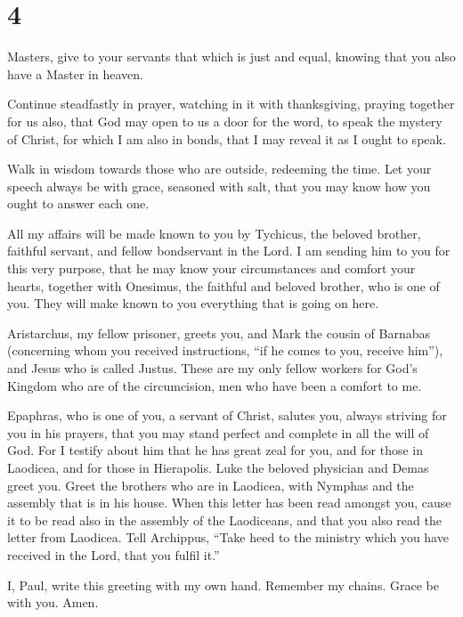 \hypertarget{section-3}{%
\section{4}\label{section-3}}

 Masters, give to your servants that which is just and
equal, knowing that you also have a Master in heaven.

 Continue steadfastly in prayer, watching in it with
thanksgiving,  praying together for us also, that God may
open to us a door for the word, to speak the mystery of Christ, for
which I am also in bonds,  that I may reveal it as I ought
to speak.

 Walk in wisdom towards those who are outside, redeeming the
time.  Let your speech always be with grace, seasoned with
salt, that you may know how you ought to answer each one.

 All my affairs will be made known to you by Tychicus, the
beloved brother, faithful servant, and fellow bondservant in the Lord.
 I am sending him to you for this very purpose, that he may
know your circumstances and comfort your hearts,  together
with Onesimus, the faithful and beloved brother, who is one of you. They
will make known to you everything that is going on here.

 Aristarchus, my fellow prisoner, greets you, and Mark the
cousin of Barnabas (concerning whom you received instructions, ``if he
comes to you, receive him''),  and Jesus who is called
Justus. These are my only fellow workers for God's Kingdom who are of
the circumcision, men who have been a comfort to me.

 Epaphras, who is one of you, a servant of Christ, salutes
you, always striving for you in his prayers, that you may stand perfect
and complete in all the will of God.  For I testify about
him that he has great zeal for you, and for those in Laodicea, and for
those in Hierapolis.  Luke the beloved physician and Demas
greet you.  Greet the brothers who are in Laodicea, with
Nymphas and the assembly that is in his house.  When this
letter has been read amongst you, cause it to be read also in the
assembly of the Laodiceans, and that you also read the letter from
Laodicea.  Tell Archippus, ``Take heed to the ministry
which you have received in the Lord, that you fulfil it.''

 I, Paul, write this greeting with my own hand. Remember my
chains. Grace be with you. Amen.
